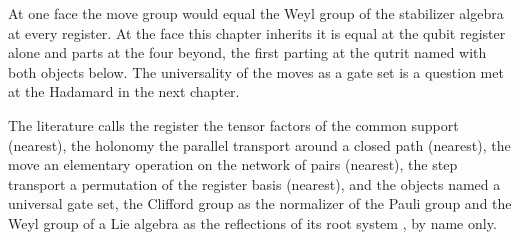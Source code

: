 At one face the move group would equal the Weyl group of the stabilizer algebra at every register. At the face this chapter inherits it is equal at the qubit register alone and parts at the four beyond, the first parting at the qutrit named with both objects below. The universality of the moves as a gate set is a question met at the Hadamard in the next chapter.
\begin{chbridge}
The literature calls the register the tensor factors of the common support (nearest), the holonomy the parallel transport around a closed path (nearest), the move an elementary operation on the network of pairs (nearest), the step transport a permutation of the register basis (nearest), and the objects named a universal gate set, the Clifford group as the normalizer of the Pauli group \cite{Gottesman1998,Nielsen2000} and the Weyl group of a Lie algebra as the reflections of its root system \cite{Weyl1927}, by name only.
\end{chbridge}
